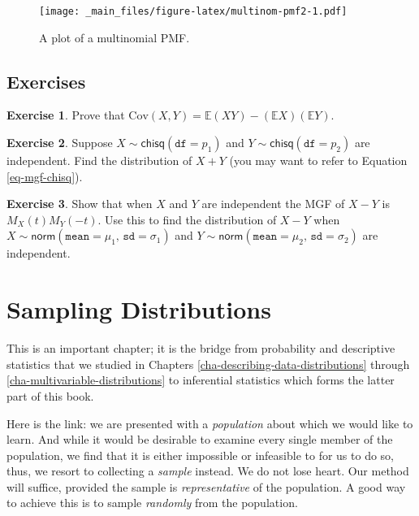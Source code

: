 \documentclass[]{book}
\numberwithin{equation}{chapter}
\numberwithin{figure}{chapter}
\theoremstyle{plain}
\theoremstyle{definition}
\newtheorem{xca}{Exercise}[chapter]
\theoremstyle{remark}
\theoremstyle{definition}
\theoremstyle{definition}
\theoremstyle{remark}
\begin{document}
\begin{figure}[htbp]
\centering
\texttt{[image: \_main\_files/figure-latex/multinom-pmf2-1.pdf]}
\caption{\label{fig:multinom-pmf2}\small A plot of a multinomial PMF.}
\end{figure}



\section{Exercises}\label{exercises-5}

\begin{xca}
Prove that
\(\mbox{Cov}(X,Y)=\mathbb{E}(XY)-(\mathbb{E} X)(\mathbb{E} Y).\)
\end{xca}

\bigskip

\begin{xca}
Suppose \(X\sim\mathsf{chisq}(\mathtt{df}=p_{1})\) and
\(Y\sim\mathsf{chisq}(\mathtt{df}=p_{2})\) are independent. Find the
distribution of \(X+Y\) (you may want to refer to Equation
\eqref{eq-mgf-chisq}).
\end{xca}

\bigskip

\begin{xca}
Show that when \(X\) and \(Y\) are independent the MGF of \(X-Y\) is
\(M_{X}(t)M_{Y}(-t)\). Use this to find the distribution of \(X-Y\) when
\(X\sim\mathsf{norm}(\mathtt{mean}=\mu_{1},\,\mathtt{sd}=\sigma_{1})\)
and
\(Y\sim\mathsf{norm}(\mathtt{mean}=\mu_{2},\,\mathtt{sd}=\sigma_{2})\)
are independent.
\end{xca}

\chapter{Sampling Distributions}\label{cha-sampling-distributions}

This is an important chapter; it is the bridge from probability and
descriptive statistics that we studied in Chapters
\ref{cha-describing-data-distributions} through
\ref{cha-multivariable-distributions} to inferential statistics which
forms the latter part of this book.

Here is the link: we are presented with a \emph{population} about which
we would like to learn. And while it would be desirable to examine every
single member of the population, we find that it is either impossible or
infeasible to for us to do so, thus, we resort to collecting a
\emph{sample} instead. We do not lose heart. Our method will suffice,
provided the sample is \emph{representative} of the population. A good
way to achieve this is to sample \emph{randomly} from the population.
\end{document}
